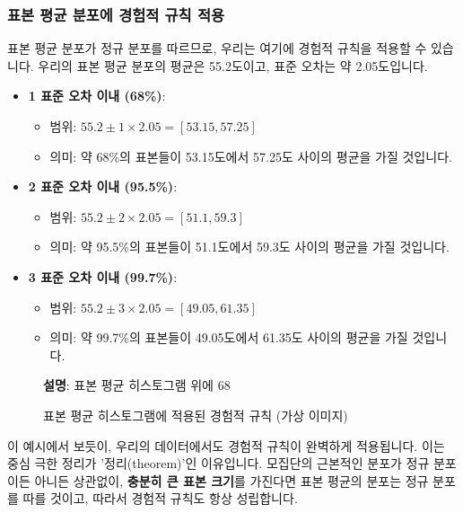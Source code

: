 \documentclass[11pt,a4paper]{article}
\theoremstyle{definition}
\begin{document}
\subsubsection*{표본 평균 분포에 경험적 규칙 적용}

표본 평균 분포가 정규 분포를 따르므로, 우리는 여기에 경험적 규칙을 적용할 수 있습니다. 우리의 표본 평균 분포의 평균은 55.2도이고, 표준 오차는 약 2.05도입니다.

\begin{itemize}
    \item \textbf{1 표준 오차 이내 (68\%)}:
    \begin{itemize}
        \item 범위: $55.2 \pm 1 \times 2.05 = [53.15, 57.25]$
        \item 의미: 약 68\%의 표본들이 53.15도에서 57.25도 사이의 평균을 가질 것입니다.
    \end{itemize}
    \item \textbf{2 표준 오차 이내 (95.5\%)}:
    \begin{itemize}
        \item 범위: $55.2 \pm 2 \times 2.05 = [51.1, 59.3]$
        \item 의미: 약 95.5\%의 표본들이 51.1도에서 59.3도 사이의 평균을 가질 것입니다.
    \end{itemize}
    \item \textbf{3 표준 오차 이내 (99.7\%)}:
    \begin{itemize}
        \item 범위: $55.2 \pm 3 \times 2.05 = [49.05, 61.35]$
        \item 의미: 약 99.7\%의 표본들이 49.05도에서 61.35도 사이의 평균을 가질 것입니다.
    \end{itemize}
\end{itemize}

\begin{figure}[h!]
    \centering
    \caption{표본 평균 히스토그램에 적용된 경험적 규칙 (가상 이미지)}
    \label{fig:excel_empirical}
    \textbf{설명}: 표본 평균 히스토그램 위에 68%
\end{figure}

\begin{warningbox}
이 예시에서 보듯이, 우리의 데이터에서도 경험적 규칙이 완벽하게 적용됩니다. 이는 중심 극한 정리가 '정리(theorem)'인 이유입니다. 모집단의 근본적인 분포가 정규 분포이든 아니든 상관없이, \textbf{충분히 큰 표본 크기}를 가진다면 표본 평균의 분포는 정규 분포를 따를 것이고, 따라서 경험적 규칙도 항상 성립합니다.
\end{warningbox}
\end{document}
